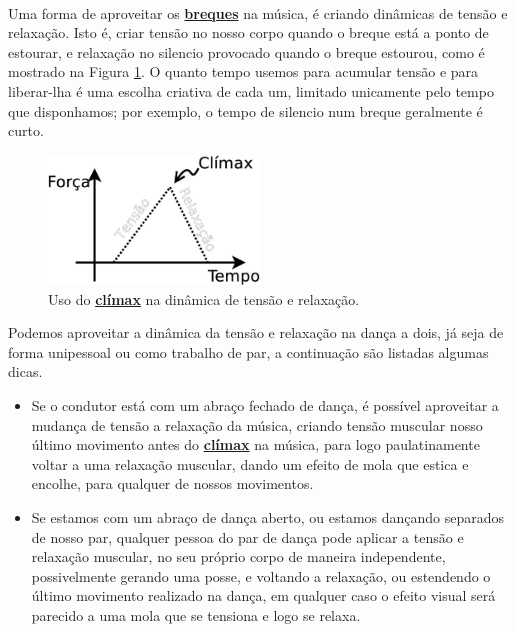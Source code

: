~


Uma forma de aproveitar os \hyperref[sec:UsandoBreak]{\textbf{breques}} na música,
é criando dinâmicas de tensão e relaxação.
Isto é, criar tensão  no nosso corpo quando o breque está a ponto de estourar,
e relaxação no silencio provocado quando o breque estourou,
como é mostrado na Figura \ref{fig:tension-release-climax}.
O quanto tempo usemos para acumular tensão e para liberar-lha 
é uma escolha criativa de cada um, 
limitado unicamente pelo tempo que disponhamos;
por exemplo, o tempo de silencio num breque geralmente é curto.



\begin{figure}[!h]
  \centering
    \includegraphics[width=0.5\textwidth]{chapters/cap-musicalidade/tension-release-climax.eps}
\caption{Uso do \hyperref[ref:climax]{\textbf{clímax}} na dinâmica de tensão e relaxação.}
\label{fig:tension-release-climax}
\end{figure}



Podemos aproveitar a dinâmica da tensão e relaxação na dança a dois,
já seja de forma unipessoal ou como trabalho de par,
a continuação são listadas algumas dicas.
\begin{itemize}
\item Se o condutor está com um abraço fechado de dança, 
é possível aproveitar a mudança de tensão a relaxação da música,
criando tensão muscular nosso último movimento antes do \hyperref[ref:climax]{\textbf{clímax}} na música,
para logo paulatinamente voltar a uma relaxação muscular,
dando um efeito de mola que estica e encolhe,
para qualquer de nossos movimentos.
\item Se estamos com um abraço de dança aberto, ou estamos dançando separados de nosso par,
qualquer pessoa do par de dança pode aplicar a tensão e relaxação muscular, 
no seu próprio corpo de maneira independente, possivelmente gerando uma posse,
e voltando a relaxação, ou estendendo o último movimento realizado na dança,
em qualquer caso o efeito visual será parecido a uma mola que se tensiona e logo se relaxa.
\end{itemize}



